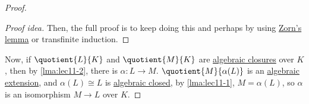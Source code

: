 \begin{proof}
\begin{proof}[Proof idea]
		Then, the full proof is to keep doing this and perhaps by using \hyperref[thm:Zorn]{Zorn's lemma} or transfinite induction.
	\end{proof}

	Now, if \(\quotient{L}{K} \) and \(\quotient{M}{K} \) are \hyperref[def:algebraically-closed]{algebraic closures} over \(K\), then by \autoref{lma:lec11-2}, there is \(\alpha \colon L \to M\). \(\quotient{M}{\alpha (L)} \) is an \hyperref[def:algebraic-extension]{algebraic extension}, and \(\alpha (L) \cong L\) is \hyperref[def:algebraically-closed]{algebraic closed}, by \autoref{lma:lec11-1}, \(M = \alpha (L)\), so \(\alpha \) is an isomorphism \(M \to L\) over \(K\).
\end{proof}